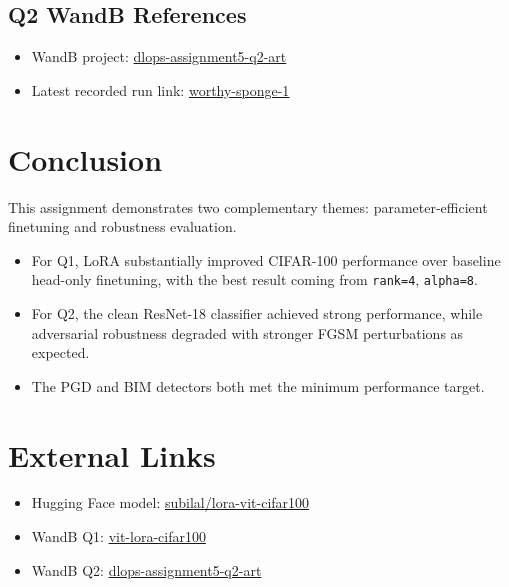 \documentclass[11pt]{article}
\begin{document}
\subsection{Q2 WandB References}
\begin{itemize}
    \item WandB project: \href{https://wandb.ai/abhikashyap4563-iit-jodhpur/dlops-assignment5-q2-art}{dlops-assignment5-q2-art}
    \item Latest recorded run link: \href{https://wandb.ai/abhikashyap4563-iit-jodhpur/dlops-assignment5-q2-art/runs/xocojyht}{worthy-sponge-1}
\end{itemize}

\section{Conclusion}
This assignment demonstrates two complementary themes: parameter-efficient finetuning and robustness evaluation.
\begin{itemize}
    \item For Q1, LoRA substantially improved CIFAR-100 performance over baseline head-only finetuning, with the best result coming from \texttt{rank=4}, \texttt{alpha=8}.
    \item For Q2, the clean ResNet-18 classifier achieved strong performance, while adversarial robustness degraded with stronger FGSM perturbations as expected.
    \item The PGD and BIM detectors both met the minimum performance target.
\end{itemize}

\section{External Links}
\begin{itemize}
    \item Hugging Face model: \href{https://huggingface.co/subilal/lora-vit-cifar100}{subilal/lora-vit-cifar100}
    \item WandB Q1: \href{https://wandb.ai/abhikashyap4563-iit-jodhpur/vit-lora-cifar100}{vit-lora-cifar100}
    \item WandB Q2: \href{https://wandb.ai/abhikashyap4563-iit-jodhpur/dlops-assignment5-q2-art}{dlops-assignment5-q2-art}
\end{itemize}
\end{document}
